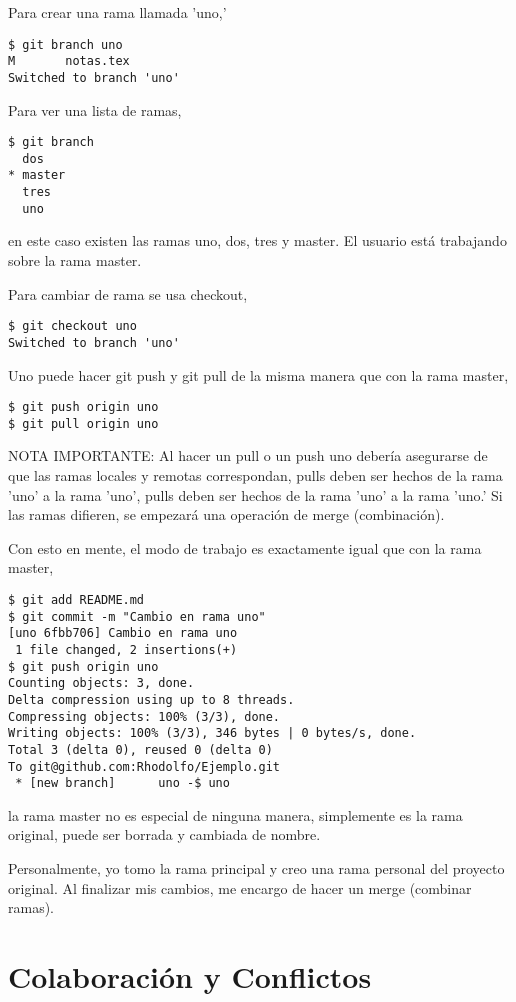 \documentclass{article}
\begin{document}
Para crear una rama llamada 'uno,'
\begin{verbatim}
$ git branch uno
M       notas.tex
Switched to branch 'uno'
\end{verbatim}  

Para ver una lista de ramas,
\begin{verbatim}
$ git branch
  dos
* master
  tres
  uno
\end{verbatim}
en este caso existen las ramas uno, dos, tres y master. 
El usuario est\'{a} trabajando sobre la rama master.  

Para cambiar de rama se usa checkout,
\begin{verbatim}
$ git checkout uno
Switched to branch 'uno'
\end{verbatim}

Uno puede hacer git push y git pull de la misma manera que con la rama master,
\begin{verbatim}
$ git push origin uno
$ git pull origin uno
\end{verbatim}
NOTA IMPORTANTE: Al hacer un pull o un push uno deber\'{i}a asegurarse de que 
las ramas locales y remotas correspondan, pulls deben ser hechos de la rama 'uno' a la rama 'uno',
pulls deben ser hechos de la rama 'uno' a la rama 'uno.'
Si las ramas difieren, se empezar\'{a} una operaci\'{o}n de merge (combinaci\'{o}n).

Con esto en mente, el modo de trabajo es exactamente igual que con la rama master,
\begin{verbatim}
$ git add README.md
$ git commit -m "Cambio en rama uno"
[uno 6fbb706] Cambio en rama uno
 1 file changed, 2 insertions(+)
$ git push origin uno
Counting objects: 3, done.
Delta compression using up to 8 threads.
Compressing objects: 100% (3/3), done.
Writing objects: 100% (3/3), 346 bytes | 0 bytes/s, done.
Total 3 (delta 0), reused 0 (delta 0)
To git@github.com:Rhodolfo/Ejemplo.git
 * [new branch]      uno -$ uno
\end{verbatim}
la rama master no es especial de ninguna manera, simplemente es la rama original, 
puede ser borrada y cambiada de nombre.

Personalmente, yo tomo la rama principal y creo una rama personal del proyecto original. 
Al finalizar mis cambios, me encargo de hacer un merge (combinar ramas).



\section{Colaboraci\'{o}n y Conflictos}
\end{document}

